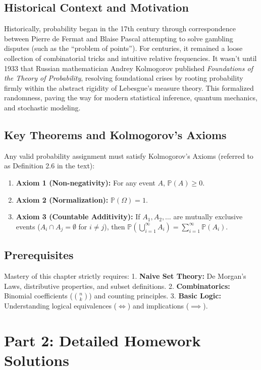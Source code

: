 \documentclass[11pt]{article}
\begin{document}
\subsection{Historical Context and Motivation}
Historically, probability began in the 17th century through correspondence between Pierre de Fermat and Blaise Pascal attempting to solve gambling disputes (such as the ``problem of points''). For centuries, it remained a loose collection of combinatorial tricks and intuitive relative frequencies. It wasn't until 1933 that Russian mathematician Andrey Kolmogorov published \textit{Foundations of the Theory of Probability}, resolving foundational crises by rooting probability firmly within the abstract rigidity of Lebesgue's measure theory. This formalized randomness, paving the way for modern statistical inference, quantum mechanics, and stochastic modeling.

\subsection{Key Theorems and Kolmogorov's Axioms}
Any valid probability assignment must satisfy Kolmogorov's Axioms (referred to as Definition 2.6 in the text):
\begin{enumerate}
    \item \textbf{Axiom 1 (Non-negativity):} For any event $A$, $\mathbb{P}(A) \ge 0$.
    \item \textbf{Axiom 2 (Normalization):} $\mathbb{P}(\Omega) = 1$.
    \item \textbf{Axiom 3 (Countable Additivity):} If $A_1, A_2, \dots$ are mutually exclusive events ($A_i \cap A_j = \emptyset$ for $i \neq j$), then $\mathbb{P}\left(\bigcup_{i=1}^\infty A_i\right) = \sum_{i=1}^\infty \mathbb{P}(A_i)$.
\end{enumerate}

\subsection{Prerequisites}
Mastery of this chapter strictly requires:
1. \textbf{Naive Set Theory:} De Morgan's Laws, distributive properties, and subset definitions.
2. \textbf{Combinatorics:} Binomial coefficients ($\binom{n}{k}$) and counting principles.
3. \textbf{Basic Logic:} Understanding logical equivalences ($\iff$) and implications ($\implies$).

\section{Part 2: Detailed Homework Solutions}
\end{document}
